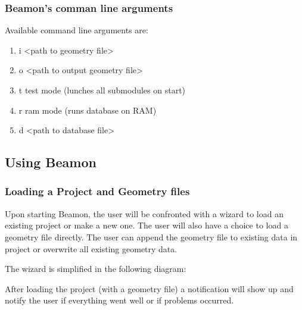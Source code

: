 \documentclass[letterpaper,10pt,english]{sphinxmanual}
\begin{document}
\subsubsection{Beamon’s comman line arguments}
\label{\detokenize{getting_started:beamon-s-comman-line-arguments}}
Available command line arguments are:
\begin{enumerate}
%
\item {} 
\sphinxhyphen{}i \textless{}path to geometry file\textgreater{}

\item {} 
\sphinxhyphen{}o \textless{}path to output geometry file\textgreater{} 

\item {} 
\sphinxhyphen{}t test mode (lunches all submodules on start)

\item {} 
\sphinxhyphen{}r ram mode (runs database on RAM)

\item {} 
\sphinxhyphen{}d \textless{}path to database file\textgreater{}

\end{enumerate}


\subsection{Using Beamon}
\label{\detokenize{getting_started:using-beamon}}

\subsubsection{Loading a Project and Geometry files}
\label{\detokenize{getting_started:loading-a-project-and-geometry-files}}
Upon starting Beamon, the user will be confronted with a wizard to load an existing project or make a new one.
The user will also have a choice to load a geometry file directly. The user can append the geometry file to existing
data in project or overwrite all existing geometry data.

The wizard is simplified in the following diagram:

\noindent{}

After loading the project (with a geometry file) a notification will show up and notify the user if
everything went well or if problems occurred.
\end{document}
